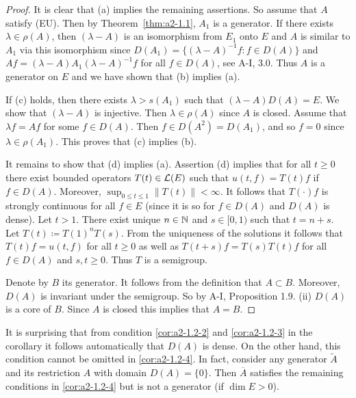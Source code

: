 \begin{proof}
It is clear that (a) implies the remaining assertions.
So assume that $A$ satisfy (EU).
Then by Theorem~\ref{thm:a2-1.1}, $A_{1}$ is a generator.
If there exists $\lambda \in \rho(A)$, then $(\lambda-A)$ is an isomorphism from $E_{1}$ onto $E$ and $A$ is similar to $A_{1}$ via this isomorphism since 
$D(A_{1}) = \{(\lambda-A)^{-1}f \colon f \in D(A)\}$ and $Af = (\lambda-A)A_{1}(\lambda-A)^{-1}f$ for all $f \in D(A)$, 
see A-I, 3.0.
Thus $A$ is a generator on $E$ and we have shown that (b) implies (a).   

If (c)  holds, then there exists $\lambda > s(A_{1})$ such that $(\lambda-A)D(A) = E$.
We show that $(\lambda-A)$ is injective.
Then $\lambda \in \rho(A)$ since $A$ is closed.
Assume that $\lambda f = Af$ for some $f \in D(A)$.
Then $f \in D(A^{2}) = D(A_{1})$, and so $f = 0$ since $\lambda \in \rho(A_{1})$.
This proves that (c) implies (b).  

It remains to show that (d)  implies (a). 
Assertion (d) implies that for all $ t \geq 0 $ there exist bounded operators $ T(t) \in \mathcal{L}(E) $ such that $ u(t,f) = T(t)f $ if $ f \in D(A) $.
Moreover, $ \sup_{0 \leq t \leq 1} \|T(t)\| < \infty $.
It follows that $ T(\cdot)f $ is strongly continuous for all $ f \in E $ (since it is so for $ f \in D(A) $ and $ D(A) $ is dense).
Let $ t > 1 $.
There exist unique $ n \in \mathbb{N} $ and $ s \in [0,1) $ such that $ t = n + s $.
Let $ T(t) \coloneqq T(1)^{n}T(s) $.
From the uniqueness of the solutions it follows that $ T(t)f = u(t,f) $ for all $ t \geq 0 $ as well as $ T(t+s)f = T(s)T(t)f $ for all $ f \in D(A) $ and $ s,t \geq 0 $.
Thus $ T $ is a semigroup.

Denote by $ B $ its generator.
It follows from the definition that $ A \subset B $.
Moreover, $ D(A) $ is invariant under the semigroup.
So by A-I, Proposition 1.9. (ii) $ D(A) $ is a core of $ B $.
Since $ A $ is closed this implies that $ A = B $.
\end{proof}
\begin{remark}\label{rem:a2-1.3}
It is surprising that from condition \ref{cor:a2-1.2-2}   and \ref{cor:a2-1.2-3}   in the corollary it follows automatically that $ D(A) $ is dense.
On the other hand, this condition cannot be omitted in \ref{cor:a2-1.2-4}.   
In fact, consider any generator $ \tilde{A} $ and its restriction $ A $ with domain $ D(A) = \{0\} $.
Then $ \overline{A} $ satisfies the remaining conditions in \ref{cor:a2-1.2-4} but is not a generator (if $ \dim E > 0 $).
\end{remark}
